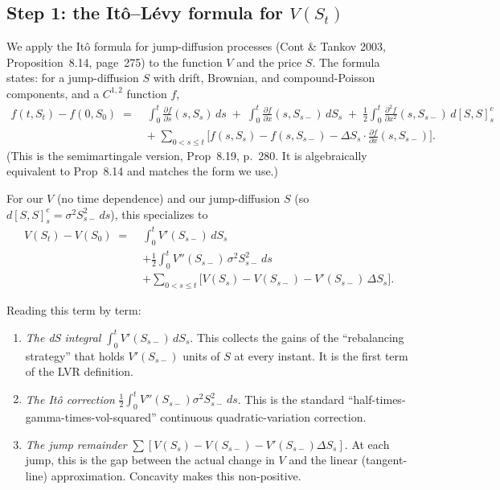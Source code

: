 \documentclass[11pt]{article}
\theoremstyle{definition}
\theoremstyle{remark}
\newcommand{\1}{\mathbf{1}}
\begin{document}
\subsection{Step 1: the Itô–Lévy formula for $V(S_t)$}

We apply the Itô formula for jump-diffusion processes (Cont \& Tankov 2003, Proposition~8.14, page~275) to the function $V$ and the price $S$. The formula states: for a jump-diffusion $S$ with drift, Brownian, and compound-Poisson components, and a $C^{1,2}$ function $f$,
\begin{align*}
f(t, S_t) - f(0, S_0) \;=\;& \int_0^t \frac{\partial f}{\partial s}(s, S_s)\,ds \;+\; \int_0^t \frac{\partial f}{\partial x}(s, S_{s-})\,dS_s \;+\; \tfrac{1}{2}\int_0^t \frac{\partial^2 f}{\partial x^2}(s, S_{s-})\,d[S, S]^c_s \\
&+\; \sum_{0 < s \le t}\!\Big[f(s, S_s) - f(s, S_{s-}) - \Delta S_s \cdot \tfrac{\partial f}{\partial x}(s, S_{s-})\Big].
\end{align*}
(This is the semimartingale version, Prop~8.19, p.~280. It is algebraically equivalent to Prop~8.14 and matches the form we use.)

For our $V$ (no time dependence) and our jump-diffusion $S$ (so $d[S,S]^c_s = \sigma^2 S_{s-}^2\,ds$), this specializes to
\begin{align*}
V(S_t) - V(S_0) \;=\;& \int_0^t V'(S_{s-})\,dS_s \\
&+ \tfrac{1}{2}\int_0^t V''(S_{s-})\,\sigma^2 S_{s-}^2\,ds \\
&+ \sum_{0 < s \le t}\!\Big[V(S_s) - V(S_{s-}) - V'(S_{s-})\,\Delta S_s\Big].
\end{align*}

Reading this term by term:
\begin{enumerate}[leftmargin=2em]
\item \emph{The dS integral} $\int_0^t V'(S_{s-})\,dS_s$. This collects the gains of the ``rebalancing strategy'' that holds $V'(S_{s-})$ units of $S$ at every instant. It is the first term of the LVR definition.
\item \emph{The Itô correction} $\tfrac{1}{2}\int_0^t V''(S_{s-})\sigma^2 S_{s-}^2\,ds$. This is the standard ``half-times-gamma-times-vol-squared'' continuous quadratic-variation correction.
\item \emph{The jump remainder} $\sum [V(S_s) - V(S_{s-}) - V'(S_{s-})\Delta S_s]$. At each jump, this is the gap between the actual change in $V$ and the linear (tangent-line) approximation. Concavity makes this non-positive.
\end{enumerate}
\end{document}
